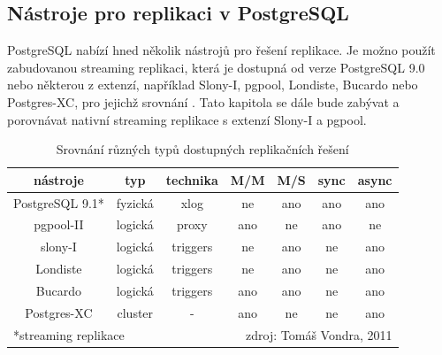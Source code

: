       \subsection{Nástroje pro replikaci v PostgreSQL}

      PostgreSQL nabízí hned několik nástrojů pro řešení replikace. Je možno použít zabudovanou streaming replikaci, která je dostupná od verze PostgreSQL 9.0 nebo některou z extenzí, například Slony-I, pgpool, Londiste, Bucardo nebo Postgres-XC, pro jejichž srovnání . Tato kapitola se dále bude zabývat a porovnávat nativní streaming replikace s extenzí Slony-I a pgpool.

        \begin{table}[H]
          \caption{Srovnání různých typů dostupných replikačních řešení}
          \label{tSrovnaniReplikace}
          \begin{footnotesize}
            \begin{center}
              \begin{tabular}{|c|cccccc|}
                \hline
                {\bf \color{purpurova7}nástroje}	& {\bf \color{purpurova7}typ} & {\bf \color{purpurova7}technika} & {\bf \color{purpurova7}M/M} & {\bf \color{purpurova7}M/S} & {\bf \color{purpurova7}sync} & a{\bf \color{purpurova7}sync} \\
                \hline
                PostgreSQL 9.1* & fyzická & xlog & ne & ano & ano & ano \\
                     pgpool-II & logická & proxy & ano & ne & ano & ne \\
                       slony-I & logická & triggers & ne & ano & ne & ano \\
                      Londiste & logická & triggers & ne & ano & ne & ano \\
                       Bucardo & logická & triggers & ano & ano & ne & ano \\
                   Postgres-XC & cluster & - & ano & ne & ne & ano \\
                \hline
                \multicolumn{3}{l}{\scriptsize{*streaming replikace}} & \multicolumn{4}{r}{\scriptsize{zdroj: Tomáš Vondra, 2011}}\\
              \end{tabular}
            \end{center}
          \end{footnotesize}
        \end{table}

